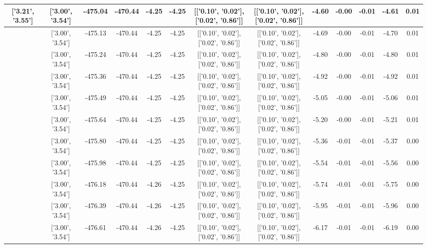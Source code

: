 \begin{table}[htbp]
\begin{adjustbox}{angle=90}
\begin{tabular}{|c|c|c|c|c|c|c|c|c|c|c|c|c|}
 ['3.21', '3.55'] & ['3.00', '3.54'] & -475.04 & -470.44 & -4.25 & -4.25 & [['0.10', '0.02'], ['0.02', '0.86']] & [['0.10', '0.02'], ['0.02', '0.86']] & -4.60 & -0.00 & -0.01 & -4.61 & 0.01\\ \hline
 ['3.24', '3.56'] & ['3.00', '3.54'] & -475.13 & -470.44 & -4.25 & -4.25 & [['0.10', '0.02'], ['0.02', '0.86']] & [['0.10', '0.02'], ['0.02', '0.86']] & -4.69 & -0.00 & -0.01 & -4.70 & 0.01\\ \hline
 ['3.28', '3.56'] & ['3.00', '3.54'] & -475.24 & -470.44 & -4.25 & -4.25 & [['0.10', '0.02'], ['0.02', '0.86']] & [['0.10', '0.02'], ['0.02', '0.86']] & -4.80 & -0.00 & -0.01 & -4.80 & 0.01\\ \hline
 ['3.32', '3.56'] & ['3.00', '3.54'] & -475.36 & -470.44 & -4.25 & -4.25 & [['0.10', '0.02'], ['0.02', '0.86']] & [['0.10', '0.02'], ['0.02', '0.86']] & -4.92 & -0.00 & -0.01 & -4.92 & 0.01\\ \hline
 ['3.36', '3.56'] & ['3.00', '3.54'] & -475.49 & -470.44 & -4.25 & -4.25 & [['0.10', '0.02'], ['0.02', '0.86']] & [['0.10', '0.02'], ['0.02', '0.86']] & -5.05 & -0.00 & -0.01 & -5.06 & 0.01\\ \hline
 ['3.40', '3.57'] & ['3.00', '3.54'] & -475.64 & -470.44 & -4.25 & -4.25 & [['0.10', '0.02'], ['0.02', '0.86']] & [['0.10', '0.02'], ['0.02', '0.86']] & -5.20 & -0.00 & -0.01 & -5.21 & 0.01\\ \hline
 ['3.43', '3.57'] & ['3.00', '3.54'] & -475.80 & -470.44 & -4.25 & -4.25 & [['0.10', '0.02'], ['0.02', '0.86']] & [['0.10', '0.02'], ['0.02', '0.86']] & -5.36 & -0.01 & -0.01 & -5.37 & 0.00\\ \hline
 ['3.47', '3.57'] & ['3.00', '3.54'] & -475.98 & -470.44 & -4.25 & -4.25 & [['0.10', '0.02'], ['0.02', '0.86']] & [['0.10', '0.02'], ['0.02', '0.86']] & -5.54 & -0.01 & -0.01 & -5.56 & 0.00\\ \hline
 ['3.51', '3.57'] & ['3.00', '3.54'] & -476.18 & -470.44 & -4.26 & -4.25 & [['0.10', '0.02'], ['0.02', '0.86']] & [['0.10', '0.02'], ['0.02', '0.86']] & -5.74 & -0.01 & -0.01 & -5.75 & 0.00\\ \hline
 ['3.55', '3.58'] & ['3.00', '3.54'] & -476.39 & -470.44 & -4.26 & -4.25 & [['0.10', '0.02'], ['0.02', '0.86']] & [['0.10', '0.02'], ['0.02', '0.86']] & -5.95 & -0.01 & -0.01 & -5.96 & 0.00\\ \hline
 ['3.59', '3.58'] & ['3.00', '3.54'] & -476.61 & -470.44 & -4.26 & -4.25 & [['0.10', '0.02'], ['0.02', '0.86']] & [['0.10', '0.02'], ['0.02', '0.86']] & -6.17 & -0.01 & -0.01 & -6.19 & 0.00\\ \hline

\end{tabular}
\end{adjustbox}
\end{table}
